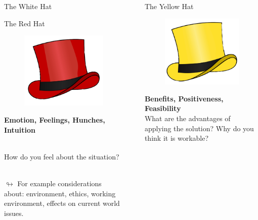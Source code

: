 \documentclass[final]{beamer}
\newlength{\sepwidth}
\newlength{\colwidth}
\newcommand{\separatorcolumn}{\begin{column}{\sepwidth}\end{column}}
\begin{document}
\begin{frame}{}
\begin{columns}[t]
\begin{column}{\colwidth}
\begin{myblock}{The White Hat}
    \end{myblock}

    \begin{myblock}{The Red Hat}
    \begin{figure}
        \includegraphics[height=0.4\textwidth]{Images/red_tr.png}
    \end{figure}
    \textbf{Emotion, Feelings, Hunches, Intuition}

    \\ How do you feel about the situation?

    \\ $\looparrowright$ For example considerations about: environment, ethics, working environment, effects on current world issues.
    \end{myblock}
  
\end{column}
\separatorcolumn
\begin{column}{\colwidth}
    \vspace{-2cm}
    \begin{myblock}{The Yellow Hat} 
    \begin{figure}
        \includegraphics[height=0.4\textwidth]{Images/yellow_tr.png}
    \end{figure}
    \textbf{Benefits, Positiveness, Feasibility}
    \\ What are the advantages of applying the solution?
    Why do you think it is workable?
    

\end{myblock}
\end{column}
\end{columns}
\end{frame}
\end{document}
